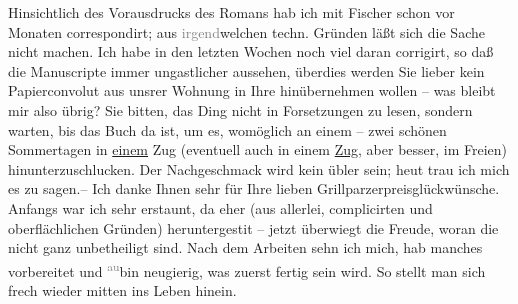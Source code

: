 \begin{ledgroupsized}[t]{13cm}
           Hinsichtlich des Vorausdrucks des Romans hab ich mit Fischer schon vor
               Monaten correspondirt; aus \textcolor{gray}{irgend}welchen techn. Gründen läßt sich
               die Sache nicht machen. Ich habe in den letzten Wochen noch viel daran corrigirt, so
               daß die Manuscripte immer ungastlicher aussehen, überdies werden Sie lieber kein {\pb}Papierconvolut aus unsrer Wohnung in Ihre
               hinübernehmen wollen – was bleibt mir also übrig? Sie bitten, das Ding nicht in Forsetzungen zu lesen,
               sondern warten, bis das Buch
               da ist, um es, womöglich an einem – zwei schönen Sommertagen in \uline{einem} Zug (eventuell auch in einem \uline{Zug},
               aber besser, im Freien) hinunterzuschlucken. Der Nachgeschmack wird kein übler sein;
               heut trau ich mich es zu sagen.–\pend
           \pstart
           Ich danke Ihnen sehr für Ihre lieben Grillparzerpreisglückwünsche. Anfangs war ich sehr erstaunt, da{\geminationn} eher (aus allerlei, complicirten und oberflächlichen
               Gründen) heruntergesti{\geminationm}t – jetzt überwiegt die Freude,
               woran die {\pb}\label{K_L03011-5v}\label{K_L03011-5h} nicht ganz unbetheiligt
               sind. Nach dem Arbeiten sehn ich mich, hab manches vorbereitet und \substVorne{}\textsuperscript{\textcolor{gray}{au}}\substDazwischen{}bin\substHinten{} neugierig, was zuerst fertig sein wird. So stellt man sich frech wieder
               mitten ins Leben hinein.\pend

\end{ledgroupsized}
